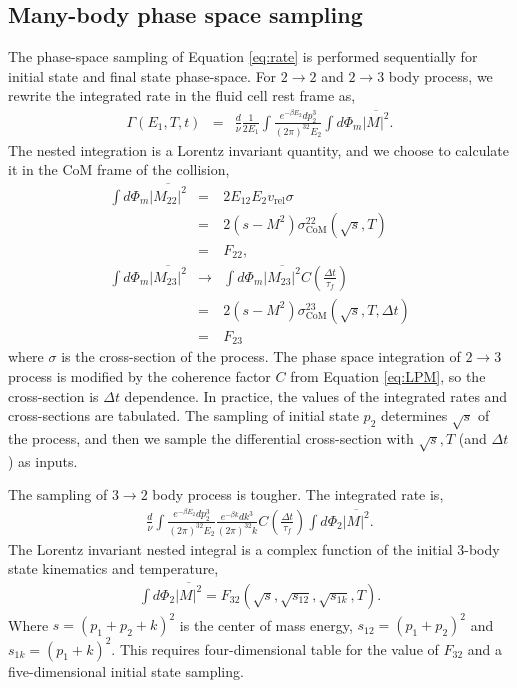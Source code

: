 \documentclass[aps, prc, reprint, amsmath, groupedaddress, nofootinbib]{revtex4-1}
\begin{document}
\begin{appendices}
\section{Many-body phase space sampling}
\label{appendix:sample}
The phase-space sampling of Equation \ref{eq:rate} is performed sequentially for initial state and final state phase-space.
For $2\rightarrow 2$ and $2\rightarrow 3$ body process, we rewrite the integrated rate in the fluid cell rest frame as,
\begin{eqnarray}
\Gamma(E_1, T, t) &=& \frac{d}{\nu} \frac{1}{2E_1}\int \frac{e^{-\beta E_2}dp_2^3}{(2\pi)^32E_2} 
\int d\Phi_m\overline{|M|^2}.
\end{eqnarray}
The nested integration is a Lorentz invariant quantity, and we choose to calculate it in the CoM frame of the collision, 
\begin{eqnarray}
\int d\Phi_m\overline{|M_{22}|^2} &=& 2E_12E_2v_{\textrm{rel}}\sigma \nonumber \\
 &=& 2(s-M^2)\sigma_{\textrm{CoM}}^{22}(\sqrt{s}, T)\nonumber \\
  &=& F_{22},\\
\int d\Phi_m\overline{|M_{23}|^2} &\rightarrow& \int d\Phi_m\overline{|M_{23}|^2} C\left(\frac{\Delta t}{\tau_f}\right) \nonumber \\
 &=& 2(s-M^2)\sigma_{\textrm{CoM}}^{23}(\sqrt{s}, T, \Delta t)\nonumber \\
 &=& F_{23}
\end{eqnarray}
where $\sigma$ is the cross-section of the process.
The phase space integration of $2\rightarrow 3$ process is modified by the coherence factor $C$ from Equation \ref{eq:LPM}, so the cross-section is $\Delta t$ dependence.
In practice, the values of the integrated rates and cross-sections are tabulated. 
The sampling of initial state $p_2$ determines $\sqrt{s}$ of the process, and then we sample the differential cross-section with $\sqrt{s}, T$ (and $\Delta t$) as inputs.

The sampling of $3\rightarrow 2$ body process is tougher.
The integrated rate is,
\begin{eqnarray}
\frac{d}{\nu} \int \frac{e^{-\beta E_2}dp_2^3}{(2\pi)^32E_2} \frac{e^{-\beta k}dk^3}{(2\pi)^32k}C\left(\frac{\Delta t}{\tau_f}\right)
\int d\Phi_2\overline{|M|^2}.
\end{eqnarray}
The Lorentz invariant nested integral is a complex function of the initial 3-body state kinematics and temperature,
\begin{eqnarray}
\int d\Phi_2\overline{|M|^2} = F_{32}(\sqrt{s}, \sqrt{s_{12}}, \sqrt{s_{1k}}, T).
\end{eqnarray}
Where $s = (p_1+p_2+k)^2$ is the center of mass energy, $s_{12} = (p_1+p_2)^2$ and $s_{1k} = (p_1+k)^2$.
This requires four-dimensional table for the value of $F_{32}$ and a five-dimensional initial state sampling.


\end{appendices}
\end{document}
